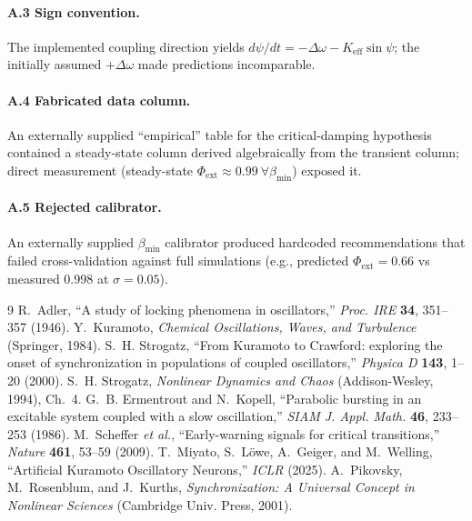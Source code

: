 \documentclass[11pt]{article}
\newcommand{\Keff}{K_{\mathrm{eff}}}
\newcommand{\bmin}{\beta_{\min}}
\newcommand{\dw}{\Delta\omega}
\begin{document}
\paragraph{A.3 Sign convention.} The implemented coupling direction yields
$d\psi/dt = -\dw - \Keff\sin\psi$; the initially assumed $+\dw$ made
predictions incomparable.

\paragraph{A.4 Fabricated data column.} An externally supplied ``empirical''
table for the critical-damping hypothesis contained a steady-state column
derived algebraically from the transient column; direct measurement
(steady-state $\Phi_{\mathrm{ext}} \approx 0.99\ \forall \bmin$) exposed it.

\paragraph{A.5 Rejected calibrator.} An externally supplied $\bmin$ calibrator
produced hardcoded recommendations that failed cross-validation against full
simulations (e.g., predicted $\Phi_{\mathrm{ext}} = 0.66$ vs measured 0.998 at
$\sigma = 0.05$).

\begin{thebibliography}{9}
 R.~Adler, ``A study of locking phenomena in oscillators,''
  \emph{Proc. IRE} \textbf{34}, 351--357 (1946).
 Y.~Kuramoto, \emph{Chemical Oscillations, Waves, and
  Turbulence} (Springer, 1984).
 S.~H. Strogatz, ``From Kuramoto to Crawford: exploring
  the onset of synchronization in populations of coupled oscillators,''
  \emph{Physica D} \textbf{143}, 1--20 (2000).
 S.~H. Strogatz, \emph{Nonlinear Dynamics and Chaos}
  (Addison-Wesley, 1994), Ch.~4.
 G.~B. Ermentrout and N.~Kopell, ``Parabolic bursting
  in an excitable system coupled with a slow oscillation,'' \emph{SIAM J.
  Appl. Math.} \textbf{46}, 233--253 (1986).
 M.~Scheffer \emph{et al.}, ``Early-warning signals for
  critical transitions,'' \emph{Nature} \textbf{461}, 53--59 (2009).
 T.~Miyato, S.~L\"owe, A.~Geiger, and M.~Welling,
  ``Artificial Kuramoto Oscillatory Neurons,'' \emph{ICLR} (2025).
 A.~Pikovsky, M.~Rosenblum, and J.~Kurths,
  \emph{Synchronization: A Universal Concept in Nonlinear Sciences}
  (Cambridge Univ. Press, 2001).
\end{thebibliography}
\end{document}
